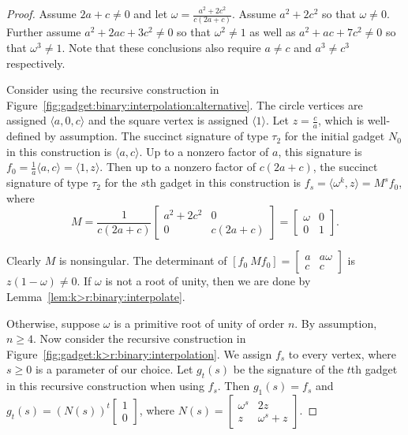 \documentclass[11pt]{article}
\begin{document}
\begin{proof}
 Assume $2 a + c \ne 0$ and let $\omega = \frac{a^2 + 2 c^2}{c (2 a + c)}$.
 Assume $a^2 + 2 c^2$ so that $\omega \ne 0$.
 Further assume $a^2 + 2 a c + 3 c^2 \ne 0$ so that $\omega^2 \ne 1$
 as well as $a^2 + a c + 7 c^2 \ne 0$ so that $\omega^3 \ne 1$.
 Note that these conclusions also require $a \ne c$ and $a^3 \ne c^3$ respectively.
 
 Consider using the recursive construction in Figure~\ref{fig:gadget:binary:interpolation:alternative}.
 The circle vertices are assigned $\langle a,0,c \rangle$ and the square vertex is assigned $\langle 1 \rangle$.
 Let $z = \frac{c}{a}$,
 which is well-defined by assumption.
 The succinct signature of type $\tau_2$ for the initial gadget $N_0$ in this construction is $\langle a,c \rangle$.
 Up to a nonzero factor of $a$,
 this signature is $f_0 = \frac{1}{a} \langle a,c \rangle = \langle 1,z \rangle$.
 Then up to a nonzero factor of $c (2 a + c)$,
 the succinct signature of type $\tau_2$ for the $s$th gadget in this construction is $f_s  = \langle \omega^k, z \rangle = M^s f_0$,
 where
 \[
  M =
  \frac{1}{c (2 a + c)}
  \left[
   \begin{smallmatrix}
    a^2 + 2 c^2 & 0 \\
    0           & c (2 a + c)
   \end{smallmatrix}
  \right]
  =
  \left[
   \begin{smallmatrix}
    \omega & 0 \\
    0 & 1
   \end{smallmatrix}
  \right].
 \]
 
 Clearly $M$ is nonsingular.
 The determinant of $[f_0\ M f_0] = \left[\begin{smallmatrix} a & a \omega \\ c & c \end{smallmatrix}\right]$ is $z (1 - \omega) \ne 0$.
 If $\omega$ is not a root of unity,
 then we are done by Lemma~\ref{lem:k>r:binary:interpolate}.
 
 Otherwise, suppose $\omega$ is a primitive root of unity of order $n$.
 By assumption, $n \ge 4$.
 Now consider the recursive construction in Figure~\ref{fig:gadget:k>r:binary:interpolation}.
 We assign $f_s$ to every vertex,
 where $s \ge 0$ is a parameter of our choice.
 Let $g_t(s)$ be the signature of the $t$th gadget in this recursive construction when using $f_s$.
 Then $g_1(s) = f_s$ and $g_t(s) = (N(s))^t \left[\begin{smallmatrix} 1 \\ 0 \end{smallmatrix}\right]$,
 where $N(s) = \left[\begin{smallmatrix} \omega^s & 2 z \\ z & \omega^s + z \end{smallmatrix}\right]$.
 

\end{proof}
\end{document}

